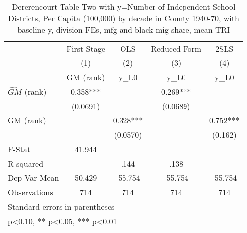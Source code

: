 \begin{table}[htbp]\centering
\def\sym#1{\ifmmode^{#1}\else\(^{#1}\)\fi}
\caption{Dererencourt Table Two with y=Number of Independent School Districts, Per Capita (100,000) by decade in County 1940-70, with baseline y, division FEs, mfg and black mig share, mean TRI}
\begin{tabular}{l*{4}{c}}
\toprule
                    & First Stage   &         OLS   &Reduced Form   &        2SLS   \\
                    &\multicolumn{1}{c}{(1)}&\multicolumn{1}{c}{(2)}&\multicolumn{1}{c}{(3)}&\multicolumn{1}{c}{(4)}\\
                    &\multicolumn{1}{c}{GM  (rank)}&\multicolumn{1}{c}{y\_L0}&\multicolumn{1}{c}{y\_L0}&\multicolumn{1}{c}{y\_L0}\\
\midrule
$\hat{GM}$ (rank)   &       0.358***&               &       0.269***&               \\
                    &    (0.0691)   &               &    (0.0689)   &               \\
\addlinespace
GM  (rank)          &               &       0.328***&               &       0.752***\\
                    &               &    (0.0570)   &               &     (0.162)   \\
\midrule
F-Stat              &      41.944   &               &               &               \\
R-squared           &               &        .144   &        .138   &               \\
Dep Var Mean        &      50.429   &     -55.754   &     -55.754   &     -55.754   \\
Observations        &         714   &         714   &         714   &         714   \\
\bottomrule
\multicolumn{5}{l}{\footnotesize Standard errors in parentheses}\\
\multicolumn{5}{l}{\footnotesize * p<0.10, ** p<0.05, *** p<0.01}\\
\end{tabular}
\end{table}
